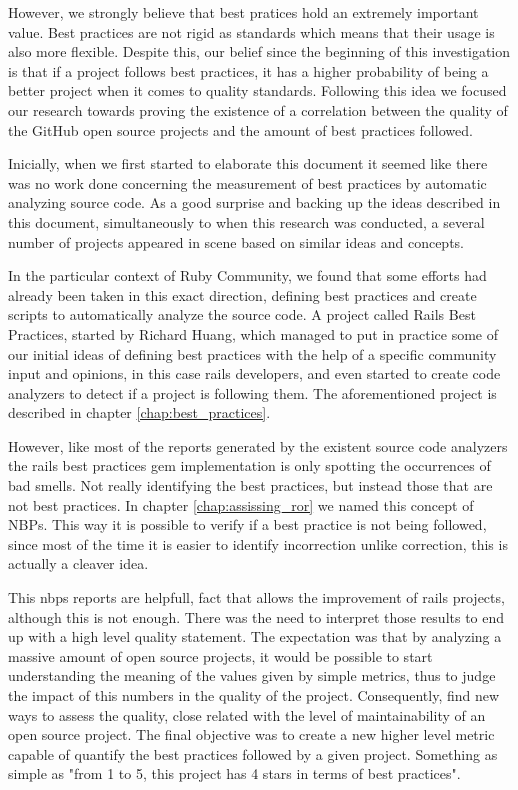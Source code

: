 However, we strongly believe that best pratices hold an extremely important value.
Best practices are not rigid as standards which means that their usage is also more flexible.
Despite this, our belief since the beginning of this investigation is that if 
a project follows best practices, it has a higher probability of being a better project when it comes to quality standards.
Following this idea we focused our research towards proving the existence of
a correlation between the quality of the GitHub open source projects and the amount of best practices followed.

Inicially, when we first started to elaborate this document it seemed like there was no work done 
concerning the measurement of best practices by automatic analyzing source code.
As a good surprise and backing up the ideas described in this document, simultaneously to when this research was conducted, 
a several number of projects appeared in scene based on similar ideas and concepts.

In the particular context of Ruby Community, we found that some efforts had already been taken in this exact direction,
defining best practices and create scripts to automatically analyze the source code.
A project called Rails Best Practices, started by Richard Huang, 
which managed to put in practice some of our initial ideas of defining best practices with 
the help of a specific community input and opinions, in this case rails developers,
and even started to create code analyzers to detect if a project is following them.
The aforementioned project is described in chapter \ref{chap:best_practices}.

However, like most of the reports generated by the existent source code analyzers
the rails best practices gem implementation is only spotting the occurrences of bad smells.
Not really identifying the best practices, but instead those that are not best practices. 
In chapter \ref{chap:assissing_ror} we named this concept of NBPs.
This way it is possible to verify if a best practice is not being followed, 
since most of the time it is easier to identify incorrection unlike correction, 
this is actually a cleaver idea.
 
This nbps reports are helpfull, fact that allows the improvement of rails projects, although this is not enough.
There was the need to interpret those results to end up with a high level quality statement.
The expectation was that by analyzing a massive amount of open source projects, it would be possible to start understanding
the meaning of the values given by simple metrics,
thus to judge the impact of this numbers in the quality of the project. 
Consequently, find new ways to assess the quality, close related with the level of maintainability of an open source project.
The final objective was to create a new higher level metric capable of quantify the best practices followed by a given project.
Something as simple as "from 1 to 5, this project has 4 stars in terms of best practices".

